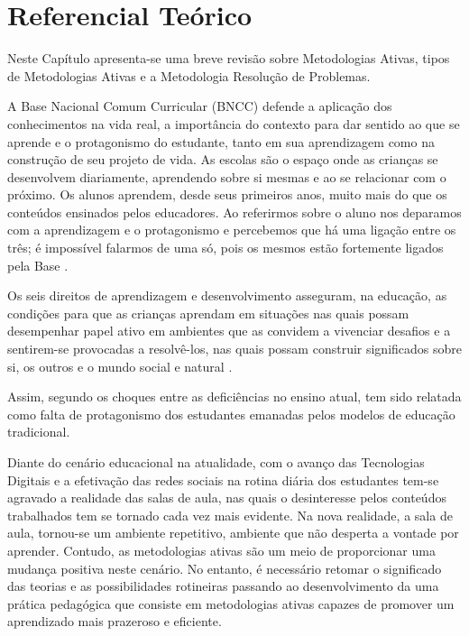 

\chapter{Referencial Teórico} \label{cap:2_referencial}

Neste Capítulo apresenta-se uma breve revisão sobre Metodologias Ativas, tipos de Metodologias Ativas e a Metodologia Resolução de Problemas.

A Base Nacional Comum Curricular (BNCC) defende a aplicação dos conhecimentos na vida real, a importância do contexto para dar sentido ao que se aprende e o protagonismo do estudante, tanto em sua aprendizagem como na construção de seu projeto de vida. As escolas são o espaço onde as crianças se desenvolvem diariamente, aprendendo sobre si mesmas e ao se relacionar com o próximo. Os alunos aprendem, desde seus primeiros anos, muito mais do que os conteúdos ensinados pelos educadores. Ao referirmos sobre o aluno nos deparamos com a aprendizagem e o protagonismo e percebemos que há uma ligação entre os três; é impossível falarmos de uma só, pois os mesmos estão fortemente ligados pela Base \cite[p. 2]{FRANCESCONI2019}.

\begin{citacao}
    Os seis direitos de aprendizagem e desenvolvimento asseguram, na educação, as condições para que as crianças aprendam em situações nas quais possam desempenhar papel ativo em ambientes que as convidem a vivenciar desafios e a sentirem-se provocadas a resolvê-los, nas quais possam construir significados sobre si, os outros e o mundo social e natural \cite[p. 35]{EducacaoSecretariadeEducacaoFundamental2017}.
\end{citacao}

Assim, segundo  os choques entre as deficiências no ensino atual, tem sido relatada como falta de protagonismo dos estudantes emanadas pelos modelos de educação tradicional.

Diante do cenário educacional na atualidade, com o avanço das Tecnologias Digitais e a efetivação das redes sociais na rotina diária dos estudantes tem-se agravado a realidade das salas de aula, nas quais o desinteresse pelos conteúdos trabalhados tem se tornado cada vez mais evidente. Na nova realidade, a sala de aula, tornou-se um ambiente repetitivo, ambiente que não desperta a vontade por aprender. Contudo, as metodologias ativas são um meio de proporcionar uma mudança positiva neste cenário. No entanto, é necessário retomar o significado das teorias e as possibilidades rotineiras passando ao desenvolvimento da uma prática pedagógica que consiste em metodologias ativas capazes de promover um aprendizado mais prazeroso e eficiente.


